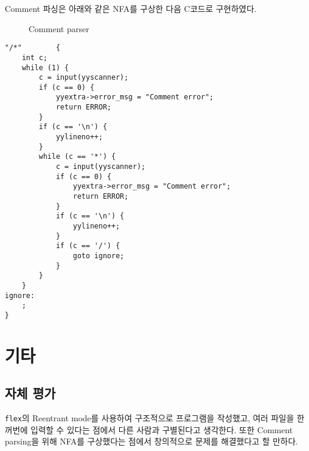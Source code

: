 \documentclass[a4paper, 10pt]{oblivoir}
\begin{document}
Comment 파싱은 아래와 같은 NFA를 구상한 다음 C코드로 구현하였다.

\begin{figure}
\caption{Comment parser}
\end{figure}

\begin{lstlisting}[caption=Segment of tiny.l, frame=single]
"/*"        {
    int c;
    while (1) {
        c = input(yyscanner);
        if (c == 0) {
            yyextra->error_msg = "Comment error";
            return ERROR;
        }
        if (c == '\n') {
            yylineno++;
        }
        while (c == '*') {
            c = input(yyscanner);
            if (c == 0) {
                yyextra->error_msg = "Comment error";
                return ERROR;
            }
            if (c == '\n') {
                yylineno++;
            }
            if (c == '/') {
                goto ignore;
            }
        }
    }
ignore:
    ;
}
\end{lstlisting}

\section{기타}
\subsection{자체 평가}
\texttt{flex}의 Reentrant mode를 사용하여 구조적으로 프로그램을 작성했고, 여러 파일을 한꺼번에 입력할 수 있다는 점에서 다른 사람과 구별된다고 생각한다. 또한 Comment parsing을 위해 NFA를 구상했다는 점에서 창의적으로 문제를 해결했다고 할 만하다.
\end{document}
